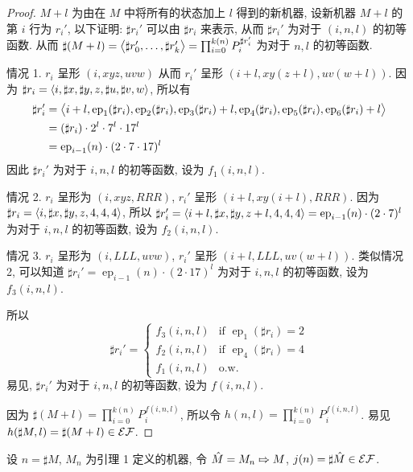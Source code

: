 \begin{solution}
\begin{proof}
$M+l$ 为由在 $M$ 中将所有的状态加上 $l$ 得到的新机器, 设新机器 $M+l$ 的第 $i$ 行为 $r_i'$, 以下证明: $\sharp r_i'$ 可以由 $\sharp r_i$ 来表示, 从而 $\sharp r_i'$ 为对于 $(i,n,l)$ 的初等函数. 从而 $\sharp (M+l) = \left \langle \sharp r_0', \dots, \sharp r_k' \right \rangle = \prod_{i=0}^{k(n)} P_i^{\sharp r_i'}$ 为对于 $n, l$ 的初等函数.

情况 1. $r_i$ 呈形 $(i,xyz,uvw)$ 从而 $r_i'$ 呈形 $(i+l,xy(z+l), uv(w+l))$. 因为 $\sharp r_i = \left \langle i, \sharp x, \sharp y, z, \sharp u, \sharp v, w \right \rangle$, 所以有
\begin{align*}
\sharp r_i' & = \left \langle i+l, \operatorname{ep}_1(\sharp r_i), \operatorname{ep}_2(\sharp r_i), \operatorname{ep}_3(\sharp r_i) + l, \operatorname{ep}_4(\sharp r_i), \operatorname{ep}_5(\sharp r_i), \operatorname{ep}_6(\sharp r_i) + l \right \rangle \\
& = (\sharp r_i) \cdot 2^l \cdot 7^l \cdot 17^l \\
& = \operatorname{ep}_{i-1}(n) \cdot (2 \cdot 7 \cdot 17)^l
\end{align*}
因此 $\sharp r_i'$ 为对于 $i,n,l$ 的初等函数, 设为 $f_1(i,n,l)$.

情况 2. $r_i$ 呈形为 $(i,xyz,RRR)$, $r_i'$ 呈形 $(i+l,xy(i+l),RRR)$. 因为 $\sharp r_i = \left \langle i,\sharp x, \sharp y, z, 4,4,4 \right \rangle$, 所以 $\sharp r_i' = \left \langle i+l,\sharp x, \sharp y, z+l,4,4,4 \right \rangle=\operatorname{ep}_{i-1}(n) \cdot (2\cdot 7)^l$ 为对于 $i,n,l$ 的初等函数, 设为 $f_2(i,n,l)$.

情况 3. $r_i$ 呈形为 $(i,LLL,uvw)$, $r_i'$ 呈形 $(i+l,LLL,uv(w+l))$. 类似情况 2, 可以知道 $\sharp r_i' = \operatorname{ep}_{i-1}(n) \cdot (2 \cdot 17)^l$ 为对于 $i,n,l$ 的初等函数, 设为 $f_3(i,n,l)$.

所以 \[
\sharp r_i' = \begin{cases}
f_3(i,n,l) & \text{if } \operatorname{ep}_1(\sharp r_i) = 2 \\
f_2(i,n,l) & \text{if } \operatorname{ep}_4(\sharp r_i) = 4 \\
f_1(i,n,l) & \text{o.w.}
\end{cases}
\]
易见, $\sharp r_i'$ 为对于 $i,n,l$ 的初等函数, 设为 $f(i,n,l)$.

因为 $\sharp (M+l) = \prod_{i=0}^{k(n)}P_i^{f(i,n,l)}$, 所以令 $h(n,l) = \prod_{i=0}^{k(n)} P_i^{f(i,n,l)}$. 易见 $h(\sharp M, l) = \sharp (M+l) \in \mathcal{EF}$.
\end{proof}

\begin{lemma}
设 $n = \sharp M$, $M_n$ 为引理 1 定义的机器, 令 $\hat{M} = M_n \concat M$, $j(n) = \sharp \hat{M} \in \mathcal{EF}$.
\end{lemma}


\end{solution}
